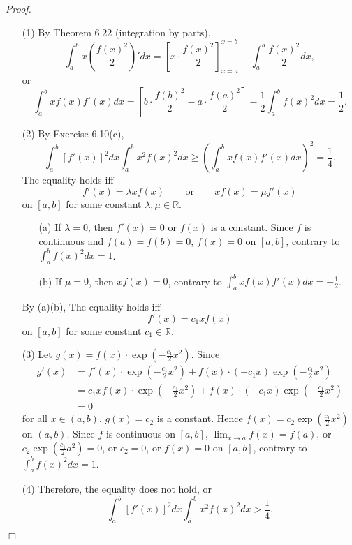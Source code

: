 \documentclass{article}
\begin{document}
\emph{Proof.}
\begin{enumerate}
  \item[(1)]
  By Theorem 6.22 (integration by parts),
  \[
    \int_{a}^{b} x \left( \frac{f(x)^2}{2} \right)' dx
    =
    \left[ x \cdot \frac{f(x)^2}{2} \right]_{x=a}^{x=b}
      - \int_{a}^{b} \frac{f(x)^2}{2} dx,
  \]
  or
  \[
    \int_{a}^{b} xf(x)f'(x) dx
    =
      \left[b \cdot \frac{f(b)^2}{2} - a \cdot \frac{f(a)^2}{2} \right]
      - \frac{1}{2} \int_{a}^{b} f(x)^2 dx
    = \frac{1}{2}.
  \]

  \item[(2)]
  By Exercise 6.10(c),
  \[
    \int_{a}^{b} [f'(x)]^2 dx \int_{a}^{b} x^2f(x)^2 dx
    \geq \left( \int_{a}^{b} xf(x)f'(x) dx \right)^2 = \frac{1}{4}.
  \]
  The equality holds iff
  \[
    f'(x) = \lambda x f(x)
  \:\:\:\:\:\:\:\:
  \text{ or }
  \:\:\:\:\:\:\:\:
  x f(x) = \mu f'(x)
  \]
  on $[a,b]$ for some constant $\lambda, \mu \in \mathbb{R}$.
  \begin{enumerate}
  \item[(a)]
    If $\lambda = 0$, then $f'(x) = 0$ or $f(x)$ is a constant.
    Since $f$ is continuous and $f(a) = f(b) = 0$, $f(x) = 0$ on $[a,b]$,
    contrary to $\int_{a}^{b} f(x)^2 dx = 1$.

  \item[(b)]
    If $\mu = 0$, then $x f(x) = 0$, contrary to $\int_{a}^{b} xf(x)f'(x) dx = -\frac{1}{2}$.
  \end{enumerate}
  By (a)(b),
  The equality holds iff
  \[
    f'(x) = c_1 x f(x)
  \]
  on $[a,b]$ for some constant $c_1 \in \mathbb{R}$.

  \item[(3)]
  Let $g(x) = f(x) \cdot \exp(-\frac{c_1}{2}x^2)$.
  Since
  \begin{align*}
    g'(x)
    &= f'(x) \cdot \exp(-\frac{c_1}{2}x^2) + f(x) \cdot (-c_1 x) \exp(-\frac{c_1}{2}x^2) \\
    &= c_1 x f(x) \cdot \exp(-\frac{c_1}{2}x^2) + f(x) \cdot (-c_1 x) \exp(-\frac{c_1}{2}x^2) \\
    &= 0
  \end{align*}
  for all $x \in (a,b)$,
  $g(x) = c_2$ is a constant.
  Hence $f(x) = c_2 \exp(\frac{c_1}{2}x^2)$ on $(a,b)$.
  Since $f$ is continuous on $[a,b]$,
  $\lim_{x \to a} f(x) = f(a)$,
  or $c_2 \exp(\frac{c_1}{2}a^2) = 0$,
  or $c_2 = 0$,
  or $f(x) = 0$ on $[a,b]$,
  contrary to $\int_{a}^{b} f(x)^2 dx = 1$.

  \item[(4)]
  Therefore, the equality does not hold, or
  \[
    \int_{a}^{b} [f'(x)]^2 dx \int_{a}^{b} x^2f(x)^2 dx > \frac{1}{4}.
  \]
\end{enumerate}
$\Box$ \\\\
\end{document}

